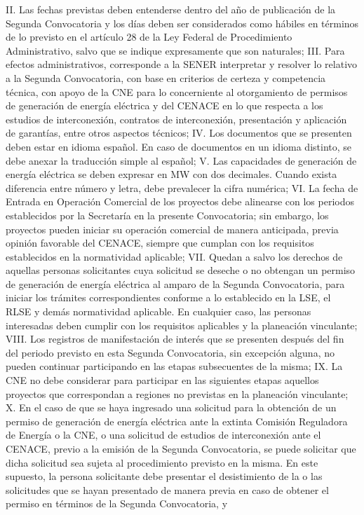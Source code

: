 II. Las fechas previstas deben entenderse dentro del año de publicación de la Segunda Convocatoria y los días deben ser considerados como hábiles en términos de lo previsto en el artículo 28 de la Ley Federal de Procedimiento Administrativo, salvo que se indique expresamente que son naturales;
III. Para efectos administrativos, corresponde a la SENER interpretar y resolver lo relativo a la Segunda Convocatoria, con base en criterios de certeza y competencia técnica, con apoyo de la CNE para lo concerniente al otorgamiento de permisos de generación de energía eléctrica y del CENACE en lo que respecta a los estudios de interconexión, contratos de interconexión, presentación y aplicación de garantías, entre otros aspectos técnicos;
IV. Los documentos que se presenten deben estar en idioma español. En caso de documentos en un idioma distinto, se debe anexar la traducción simple al español;
V. Las capacidades de generación de energía eléctrica se deben expresar en MW con dos decimales. Cuando exista diferencia entre número y letra, debe prevalecer la cifra numérica;
VI. La fecha de Entrada en Operación Comercial de los proyectos debe alinearse con los periodos establecidos por la Secretaría en la presente Convocatoria; sin embargo, los proyectos pueden iniciar su operación comercial de manera anticipada, previa opinión favorable del CENACE, siempre que cumplan con los requisitos establecidos en la normatividad aplicable;
VII. Quedan a salvo los derechos de aquellas personas solicitantes cuya solicitud se deseche o no obtengan un permiso de generación de energía eléctrica al amparo de la Segunda Convocatoria, para iniciar los trámites correspondientes conforme a lo establecido en la LSE, el RLSE y demás normatividad aplicable. En cualquier caso, las personas interesadas deben cumplir con los requisitos aplicables y la planeación vinculante;
VIII. Los registros de manifestación de interés que se presenten después del fin del periodo previsto en esta Segunda Convocatoria, sin excepción alguna, no pueden continuar participando en las etapas subsecuentes de la misma;
IX. La CNE no debe considerar para participar en las siguientes etapas aquellos proyectos que correspondan a regiones no previstas en la planeación vinculante;
X. En el caso de que se haya ingresado una solicitud para la obtención de un permiso de generación de energía eléctrica ante la extinta Comisión Reguladora de Energía o la CNE, o una solicitud de estudios de interconexión ante el CENACE, previo a la emisión de la Segunda Convocatoria, se puede solicitar que dicha solicitud sea sujeta al procedimiento previsto en la misma. En este supuesto, la persona solicitante debe presentar el desistimiento de la o las solicitudes que se hayan presentado de manera previa en caso de obtener el permiso en términos de la Segunda Convocatoria, y
